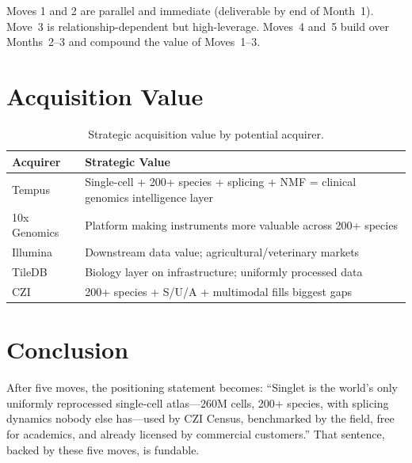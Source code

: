 \documentclass[10pt,twocolumn,letterpaper]{article}
\begin{document}
Moves 1 and 2 are parallel and immediate (deliverable by end of Month~1).
Move~3 is relationship-dependent but high-leverage. Moves~4 and~5 build over
Months~2--3 and compound the value of Moves~1--3.

\section{Acquisition Value}
\label{sec:acquisition}

\begin{table}[h]
\centering
\small
\begin{tabular}{@{}lp{5cm}@{}}
\toprule
\textbf{Acquirer} & \textbf{Strategic Value} \\
\midrule
Tempus & Single-cell + 200+ species + splicing + NMF = clinical genomics
  intelligence layer \\
10x Genomics & Platform making instruments more valuable across 200+ species \\
Illumina & Downstream data value; agricultural/veterinary markets \\
TileDB & Biology layer on infrastructure; uniformly processed data \\
CZI & 200+ species + S/U/A + multimodal fills biggest gaps \\
\bottomrule
\end{tabular}
\caption{Strategic acquisition value by potential acquirer.}
\label{tab:acquisition}
\end{table}

\section{Conclusion}

After five moves, the positioning statement becomes: ``Singlet is the world's
only uniformly reprocessed single-cell atlas---260M cells, 200+ species, with
splicing dynamics nobody else has---used by CZI Census, benchmarked by the field,
free for academics, and already licensed by commercial customers.'' That
sentence, backed by these five moves, is fundable.



\end{document}
